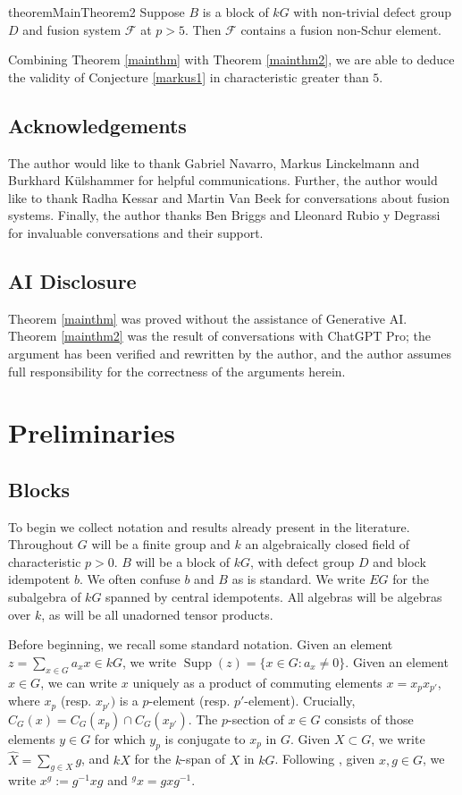 \documentclass{amsart}
\theoremstyle{plain}\newtheorem{theorem}{Theorem}[section]
\theoremstyle{plain}\newtheorem{conjecture}[theorem]{Conjecture}
\theoremstyle{plain}\newtheorem{corollary}[theorem]{Corollary}
\theoremstyle{plain}\newtheorem{lemma}[theorem]{Lemma}
\theoremstyle{plain}\newtheorem{proposition}[theorem]{Proposition}
\theoremstyle{plain}\newtheorem{statement}[theorem]{}
\theoremstyle{definition}\newtheorem{definition}[theorem]{Definition}
\theoremstyle{definition}\newtheorem{example}[theorem]{Example}
\theoremstyle{definition}\newtheorem{examples}[theorem]{Examples}
\theoremstyle{definition}\newtheorem{notation}[theorem]{Notation}
\theoremstyle{definition}\newtheorem{remark}[theorem]{Remark}
\theoremstyle{definition}\newtheorem{remarks}[theorem]{Remarks}
\theoremstyle{definition}\newtheorem{question}[theorem]{Question}
\theoremstyle{definition}\newtheorem{propositiondefinition}[theorem]{Definition/Proposition}
\begin{document}
\begin{restatable}{theorem}{MainTheorem2}\label{mainthm2} Suppose $B$ is a block of $kG$ with non-trivial defect group $D$ and fusion system $\mathcal{F}$ at $p>5$. Then $\mathcal{F}$ contains a fusion non-Schur element.
\end{restatable}

Combining Theorem \ref{mainthm} with Theorem \ref{mainthm2}, we are able to deduce the validity of Conjecture \ref{markus1} in characteristic greater than $5$.



\subsection*{Acknowledgements} The author would like to thank Gabriel Navarro, Markus Linckelmann and Burkhard K{\"u}lshammer for helpful communications. Further, the author would like to thank Radha Kessar and Martin Van Beek for conversations about fusion systems. Finally, the author thanks Ben Briggs and Lleonard Rubio y Degrassi for invaluable conversations and their support.

\subsection*{AI Disclosure} Theorem \ref{mainthm} was proved without the assistance of Generative AI. Theorem \ref{mainthm2} was the result of conversations with ChatGPT Pro; the argument has been verified and rewritten by the author, and the author assumes full responsibility for the correctness of the arguments herein. 

\section{Preliminaries}
\subsection{Blocks}
To begin we collect notation and results already present in the literature. Throughout $G$ will be a finite group and $k$ an algebraically closed field of characteristic $p>0$. $B$ will be a block of $kG$, with defect group $D$ and block idempotent $b$. We often confuse $b$ and $B$ as is standard. We write $EG$ for the subalgebra of $kG$ spanned by central idempotents. All algebras will be algebras over $k$, as will be all unadorned tensor products.

Before beginning, we recall some standard notation. Given an element $z=\sum_{x \in G} a_xx \in kG$, we write $\operatorname{Supp}(z) = \{x \in G: a_x\not=0\}$. Given an element $x \in G$, we can write $x$ uniquely as a product of commuting elements $x=x_px_{p'}$, where $x_p$ (resp. $x_{p'})$ is a $p$-element (resp. $p'$-element). Crucially, $C_G(x)= C_G(x_p)\cap C_G(x_{p'})$. The $p$-section of $x \in G$ consists of those elements $y \in G$ for which $y_p$ is conjugate to $x_p$ in $G$. Given $X \subset G$, we write $\widehat{X} = \sum_{g \in X} g$, and $kX$ for the $k$-span of $X$ in $kG$. Following \cite{AKO}, given $x, g \in G$, we write $x^g := g^{-1}xg$ and $\hspace{0pt}^gx = gxg^{-1}$.
\end{document}
